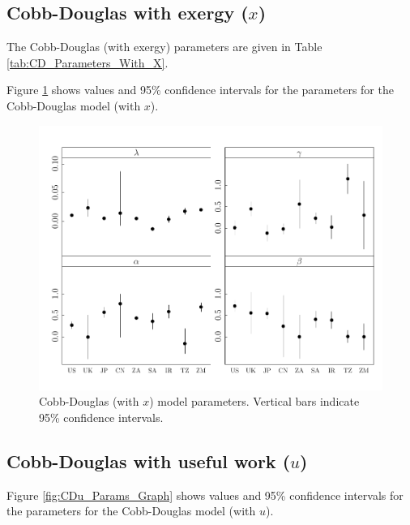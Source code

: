 \documentclass[preprint,authoryear,12pt]{elsarticle}\usepackage{graphicx, color}
\makeatletter
\def\maxwidth{ %
  \ifdim\Gin@nat@width>\linewidth
    \linewidth
  \else
    \Gin@nat@width
  \fi
}
\newenvironment{knitrout}{}{} %
\makeatother
\begin{document}
\subsection{Cobb-Douglas with exergy ($x$)}

The Cobb-Douglas (with exergy) parameters are given in Table \ref{tab:CD_Parameters_With_X}.

Figure \ref{fig:CDx_Params_Graph} shows values and 95\% confidence intervals for the parameters for the Cobb-Douglas model (with $x$).

\begin{knitrout}
\color{fgcolor}\begin{figure}[]

\includegraphics[width=\maxwidth]{figure/CDx_Params_Graph} \caption[Cobb-Douglas (with $x$) model parameters]{Cobb-Douglas (with $x$) model parameters. Vertical bars indicate 95\% confidence intervals.\label{fig:CDx_Params_Graph}}
\end{figure}


\end{knitrout}


\subsection{Cobb-Douglas with useful work ($u$)}

Figure \ref{fig:CDu_Params_Graph} shows values and 95\% confidence intervals for the parameters for the Cobb-Douglas model (with $u$).
\end{document}
